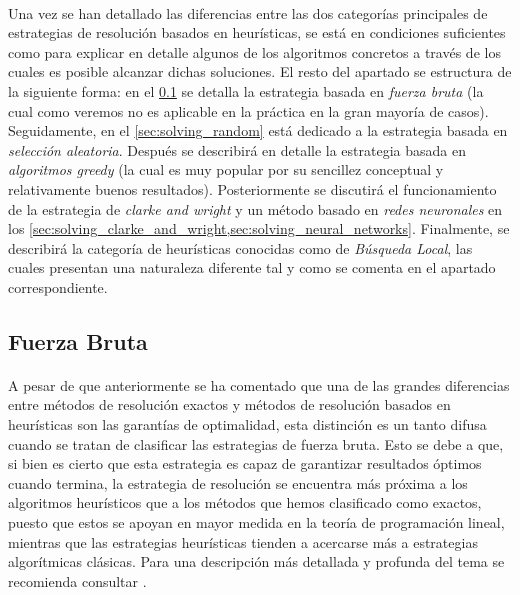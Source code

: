 \documentclass{subfiles}
\begin{document}
      \paragraph{}
      Una vez se han detallado las diferencias entre las dos categorías principales de estrategias de resolución basados en heurísticas, se está en condiciones suficientes como para explicar en detalle algunos de los algoritmos concretos a través de los cuales es posible alcanzar dichas soluciones. El resto del apartado se estructura de la siguiente forma: en el \cref{sec:solving_brute_force} se detalla la estrategia basada en \emph{fuerza bruta} (la cual como veremos no es aplicable en la práctica en la gran mayoría de casos). Seguidamente, en el \cref{sec:solving_random} está dedicado a la estrategia basada en \emph{selección aleatoria}. Después se describirá en detalle la estrategia basada en \emph{algoritmos greedy} (la cual es muy popular por su sencillez conceptual y relativamente buenos resultados). Posteriormente se discutirá el funcionamiento de la estrategia de \emph{clarke and wright} y un método basado en \emph{redes neuronales} en los \cref{sec:solving_clarke_and_wright,sec:solving_neural_networks}. Finalmente, se describirá la categoría de heurísticas conocidas como de \emph{Búsqueda Local}, las cuales presentan una naturaleza diferente tal y como se comenta en el apartado correspondiente.

      \subsection{Fuerza Bruta}
      \label{sec:solving_brute_force}

        \paragraph{}
        A pesar de que anteriormente se ha comentado que una de las grandes diferencias entre métodos de resolución exactos y métodos de resolución basados en heurísticas son las garantías de optimalidad, esta distinción es un tanto difusa cuando se tratan de clasificar las estrategias de fuerza bruta. Esto se debe a que, si bien es cierto que esta estrategia es capaz de garantizar resultados óptimos cuando termina, la estrategia de resolución se encuentra más próxima a los algoritmos heurísticos que a los métodos que hemos clasificado como exactos, puesto que estos se apoyan en mayor medida en la teoría de programación lineal, mientras que las estrategias heurísticas tienden a acercarse más a estrategias algorítmicas clásicas. Para una descripción más detallada y profunda del tema se recomienda consultar \cite{cormen2009introduction}.
\end{document}
